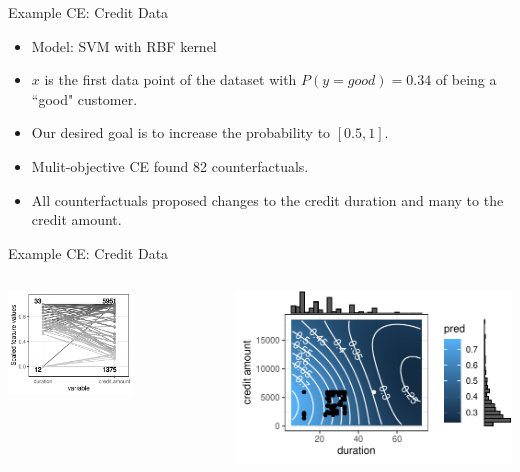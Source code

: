 \documentclass[aspectratio=169]{../latex_main/tntbeamer}  %
\begin{document}
\begin{frame}[c]{Example CE: Credit Data}
	\begin{itemize}
		\item Model: SVM with RBF kernel
		\item $x$ is the first data point of the dataset with $P(y = good)  = 0.34$ of being a ``good" customer.  
		\item Our desired goal is to increase the probability to $[0.5, 1]$.
		\item Mulit-objective CE found 82 counterfactuals.
		\item All counterfactuals proposed changes to the credit duration and many to the credit amount.  
	\end{itemize}
	
\end{frame}
\begin{frame}{Example CE: Credit Data}
    \vspace{-2em}
	\begin{columns}
				\begin{column}{0.5\textwidth}  
			\begin{center}
				\includegraphics[width=0.6\textwidth]{figure/counterfactuals_credit_parallel}
			\end{center}
			
		\end{column}
		\begin{column}{0.5\textwidth}
			\begin{center}
				\includegraphics[width=.8\textwidth]{figure/counterfactuals_credit_heat}
			\end{center}
				

\end{column}
\end{columns}
\end{frame}
\end{document}
